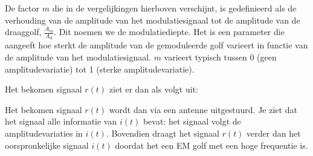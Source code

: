 De factor $m$ die in de vergelijkingen hierboven verschijnt, is gedefinieerd als de verhouding van de amplitude van het modulatiesignaal tot de amplitude van de draaggolf, $\frac{A_m}{A_d}$. Dit noemen we de modulatiediepte. Het is een parameter die aangeeft hoe sterkt de amplitude van de gemoduleerde golf varieert in functie van de amplitude van het modulatiesignaal. $m$ varieert typisch tussen 0 (geen amplitudevariatie) tot 1 (sterke amplitudevariatie).

Het bekomen signaal $r(t)$ ziet er dan als volgt uit:

\begin{center}
\end{center}

Het bekomen signaal $r(t)$ wordt dan via een antenne uitgestuurd. Je ziet dat het signaal alle informatie van $i(t)$ bevat: het signaal volgt de amplitudevariaties in $i(t)$. Bovendien draagt het signaal $r(t)$ verder dan het oorspronkelijke signaal $i(t)$ doordat het een EM golf met een hoge frequentie is.

